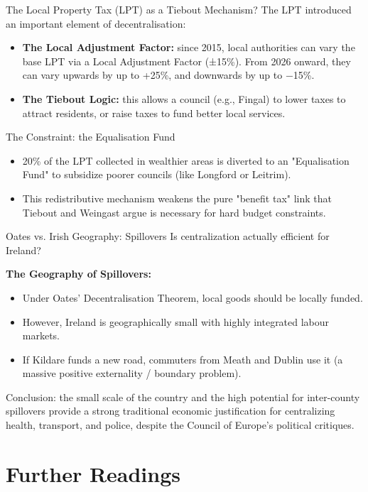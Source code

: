\documentclass[10pt]{beamer}
\begin{document}
\begin{frame}{The Local Property Tax (LPT) as a Tiebout Mechanism?}
The LPT introduced an important element of decentralisation:
\begin{itemize}
\item \textbf{The Local Adjustment Factor:} since 2015, local authorities can vary the base LPT via a Local Adjustment Factor (±15\%). From 2026 onward, they can vary upwards by up to +25\%, and downwards by up to −15\%.
\item \textbf{The Tiebout Logic:} this allows a council (e.g., Fingal) to lower taxes to attract residents, or raise taxes to fund better local services.
\end{itemize}

\alert{The Constraint: the Equalisation Fund}
\begin{itemize}
\item 20\% of the LPT collected in wealthier areas is diverted to an "Equalisation Fund" to subsidize poorer councils (like Longford or Leitrim).
\item This redistributive mechanism weakens the pure "benefit tax" link that Tiebout and Weingast argue is necessary for hard budget constraints.
\end{itemize}
\end{frame}

\begin{frame}{Oates vs. Irish Geography: Spillovers}
Is centralization actually efficient for Ireland?

\textbf{The Geography of Spillovers:}
\begin{itemize}
\item Under Oates' Decentralisation Theorem, local goods should be locally funded.
\item However, Ireland is geographically small with highly integrated labour markets.
\item If Kildare funds a new road, commuters from Meath and Dublin use it (a massive positive externality / boundary problem).
\end{itemize}
\alert{Conclusion:} the small scale of the country and the high potential for inter-county spillovers provide a strong traditional economic justification for centralizing health, transport, and police, despite the Council of Europe's political critiques.
\end{frame}


\section*{Further Readings}
\end{document}
